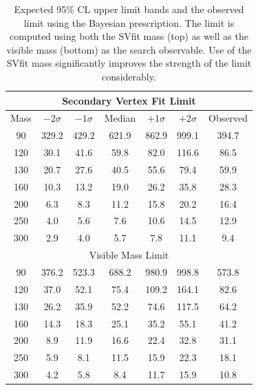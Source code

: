\begin{table}
  \begin{center}
    \begin{tabular}{|c|c|c|c|c|c|c|}
    \hline
    \hline
    \multicolumn{7}{|c|}{Secondary Vertex Fit Limit} \\
    \hline
    {Mass} & ${-2\sigma}$ & ${-1\sigma}$ & {Median} & ${+1\sigma}$ & ${+2\sigma}$ &
    {Observed} \\
    \hline
    90 & 329.2 & 429.2 & 621.9 & 862.9 & 999.1 & 394.7\\
    120 & 30.1 & 41.6 & 59.8 & 82.0 & 116.6 & 86.5\\
    130 & 20.7 & 27.6 & 40.5 & 55.6 & 79.4 & 59.9\\
    160 & 10.3 & 13.2 & 19.0 & 26.2 & 35.8 & 28.3\\
    200 & 6.3 & 8.3 & 11.2 & 15.8 & 20.2 & 16.4\\
    250 & 4.0 & 5.6 & 7.6 & 10.6 & 14.5 & 12.9\\
    300 & 2.9 & 4.0 & 5.7 & 7.8 & 11.1 & 9.4\\
    \hline
    \hline
    \multicolumn{7}{|c|}{Visible Mass Limit} \\
    \hline
    90 & 376.2 & 523.3 & 688.2 & 980.9 & 998.8 & 573.8\\
    120 & 37.0 & 52.1 & 75.4 & 109.2 & 164.1 & 82.6\\
    130 & 26.2 & 35.9 & 52.2 & 74.6 & 117.5 & 64.2\\
    160 & 14.3 & 18.3 & 25.1 & 35.2 & 55.1 & 41.2\\
    200 & 8.9 & 11.9 & 16.6 & 22.4 & 32.8 & 31.1\\
    250 & 5.9 & 8.1 & 11.5 & 15.9 & 22.3 & 18.1\\
    300 & 4.2 & 5.8 & 8.4 & 11.7 & 15.9 & 10.8\\
    \hline 
    \hline
    \end{tabular}
    \caption[Expected and observed 95\% CL $\sigma \times \text{BR}$ upper
    limits] {Expected 95\% CL upper limit bands and the observed limit using the
    Bayesian prescription.  The limit is computed using both the SVfit mass
    (top) as well as the visible mass (bottom) as the search observable.  Use of
    the SVfit mass significantly improves the strength of the limit
    considerably.  } \label{tab-exp-limit-TaNC}
  \end{center}
\end{table}
